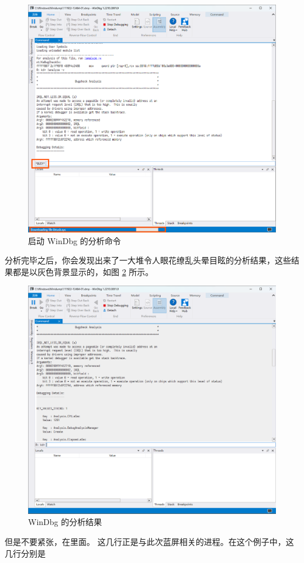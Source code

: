 \begin{figure}[htb!]
  \centering
  \includegraphics[width=.83\textwidth]{assets/WinDbg-2.png}
  \caption{启动 WinDbg 的分析命令}
  \label{WinDbg-2}
\end{figure}

分析完毕之后，你会发现出来了一大堆令人眼花缭乱头晕目眩的分析结果，这些结果都是以灰色背景显示的，如图 \ref{WinDbg-3} 所示。

\begin{figure}[htb!]
  \centering
  \includegraphics[width=.8\textwidth]{assets/WinDbg-3.png}
  \caption{WinDbg 的分析结果}
  \label{WinDbg-3}
\end{figure}

但是不要紧张，在里面。
这几行正是与此次蓝屏相关的进程。在这个例子中，这几行分别是

